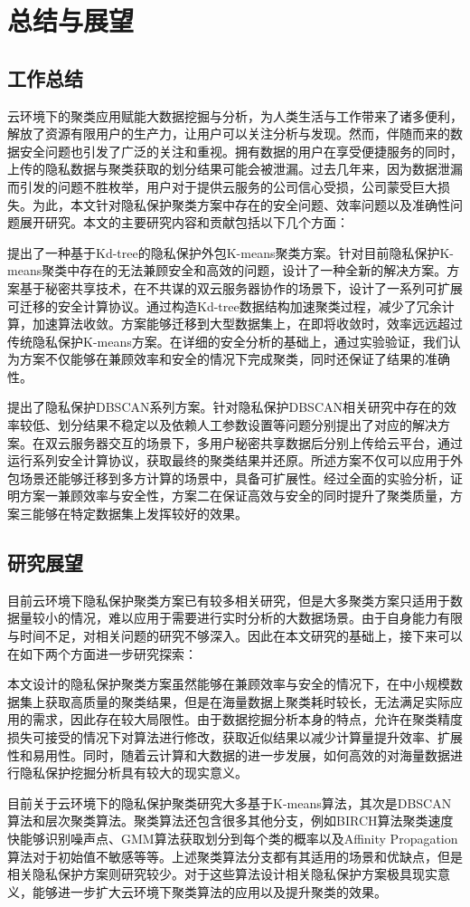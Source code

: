 \chapter{总结与展望}
\section{工作总结}
云环境下的聚类应用赋能大数据挖掘与分析，为人类生活与工作带来了诸多便利，解放了资源有限用户的生产力，让用户可以关注分析与发现。然而，伴随而来的数据安全问题也引发了广泛的关注和重视。拥有数据的用户在享受便捷服务的同时，上传的隐私数据与聚类获取的划分结果可能会被泄漏。过去几年来，因为数据泄漏而引发的问题不胜枚举，用户对于提供云服务的公司信心受损，公司蒙受巨大损失。为此，本文针对隐私保护聚类方案中存在的安全问题、效率问题以及准确性问题展开研究。本文的主要研究内容和贡献包括以下几个方面：

\begin{compactitem}
	\item 
	提出了一种基于Kd-tree的隐私保护外包K-means聚类方案。针对目前隐私保护K-means聚类中存在的无法兼顾安全和高效的问题，设计了一种全新的解决方案。方案基于秘密共享技术，在不共谋的双云服务器协作的场景下，设计了一系列可扩展可迁移的安全计算协议。通过构造Kd-tree数据结构加速聚类过程，减少了冗余计算，加速算法收敛。方案能够迁移到大型数据集上，在即将收敛时，效率远远超过传统隐私保护K-means方案。在详细的安全分析的基础上，通过实验验证，我们认为方案不仅能够在兼顾效率和安全的情况下完成聚类，同时还保证了结果的准确性。
	\item 
	提出了隐私保护DBSCAN系列方案。针对隐私保护DBSCAN相关研究中存在的效率较低、划分结果不稳定以及依赖人工参数设置等问题分别提出了对应的解决方案。在双云服务器交互的场景下，多用户秘密共享数据后分别上传给云平台，通过运行系列安全计算协议，获取最终的聚类结果并还原。所述方案不仅可以应用于外包场景还能够迁移到多方计算的场景中，具备可扩展性。经过全面的实验分析，证明方案一兼顾效率与安全性，方案二在保证高效与安全的同时提升了聚类质量，方案三能够在特定数据集上发挥较好的效果。
\end{compactitem}

\section{研究展望}
目前云环境下隐私保护聚类方案已有较多相关研究，但是大多聚类方案只适用于数据量较小的情况，难以应用于需要进行实时分析的大数据场景。由于自身能力有限与时间不足，对相关问题的研究不够深入。因此在本文研究的基础上，接下来可以在如下两个方面进一步研究探索：

本文设计的隐私保护聚类方案虽然能够在兼顾效率与安全的情况下，在中小规模数据集上获取高质量的聚类结果，但是在海量数据上聚类耗时较长，无法满足实际应用的需求，因此存在较大局限性。由于数据挖掘分析本身的特点，允许在聚类精度损失可接受的情况下对算法进行修改，获取近似结果以减少计算量提升效率、扩展性和易用性。同时，随着云计算和大数据的进一步发展，如何高效的对海量数据进行隐私保护挖掘分析具有较大的现实意义。

目前关于云环境下的隐私保护聚类研究大多基于K-means算法，其次是DBSCAN算法和层次聚类算法。聚类算法还包含很多其他分支，例如BIRCH算法聚类速度快能够识别噪声点、GMM算法获取划分到每个类的概率以及Affinity Propagation算法对于初始值不敏感等等。上述聚类算法分支都有其适用的场景和优缺点，但是相关隐私保护方案则研究较少。对于这些算法设计相关隐私保护方案极具现实意义，能够进一步扩大云环境下聚类算法的应用以及提升聚类的效果。
